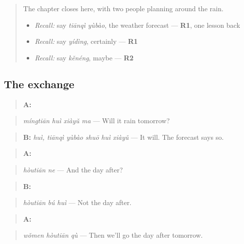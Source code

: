 \begin{quote}
The chapter closes here, with two people planning around the rain.

\begin{itemize}
\raggedright
  \item \emph{Recall:} say \emph{tiānqì yùbào}, the weather forecast — \textbf{R1}, one lesson back
  \item \emph{Recall:} say \emph{yídìng}, certainly — \textbf{R1}
  \item \emph{Recall:} say \emph{kěnéng}, maybe — \textbf{R2}
\end{itemize}
\end{quote}

\subsection*{The exchange}
\begin{quote}
\textbf{A:} 
\end{quote}

\begin{quote}
\emph{míngtiān huì xiàyǔ ma} — Will it rain tomorrow?
\end{quote}

\begin{quote}
\textbf{B:} \emph{huì, tiānqì yùbào shuō huì xiàyǔ} — It will. The forecast says so.
\end{quote}

\begin{quote}
\textbf{A:} 
\end{quote}

\begin{quote}
\emph{hòutiān ne} — And the day after?
\end{quote}

\begin{quote}
\textbf{B:} 
\end{quote}

\begin{quote}
\emph{hòutiān bú huì} — Not the day after.
\end{quote}

\begin{quote}
\textbf{A:} 
\end{quote}

\begin{quote}
\emph{wǒmen hòutiān qù} — Then we'll go the day after tomorrow.
\end{quote}

